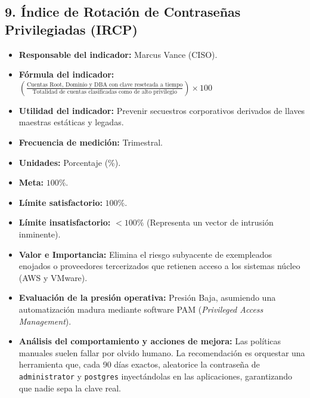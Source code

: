 \documentclass[11pt,a4paper]{article}
\begin{document}
\subsection{9. Índice de Rotación de Contraseñas Privilegiadas (IRCP)}
\begin{itemize}[label={--}, itemsep=0.1cm]
    \item \textbf{Responsable del indicador:} Marcus Vance (CISO).
    \item \textbf{Fórmula del indicador:} $\left(\frac{\text{Cuentas Root, Dominio y DBA con clave reseteada a tiempo}}{\text{Totalidad de cuentas clasificadas como de alto privilegio}}\right) \times 100$
    \item \textbf{Utilidad del indicador:} Prevenir secuestros corporativos derivados de llaves maestras estáticas y legadas.
    \item \textbf{Frecuencia de medición:} Trimestral.
    \item \textbf{Unidades:} Porcentaje (\%).
    \item \textbf{Meta:} $100\%$.
    \item \textbf{Límite satisfactorio:} $100\%$.
    \item \textbf{Límite insatisfactorio:} $< 100\%$ (Representa un vector de intrusión inminente).
    \item \textbf{Valor e Importancia:} Elimina el riesgo subyacente de exempleados enojados o proveedores tercerizados que retienen acceso a los sistemas núcleo (AWS y VMware).
    \item \textbf{Evaluación de la presión operativa:} Presión Baja, asumiendo una automatización madura mediante software PAM (\textit{Privileged Access Management}).
    \item \textbf{Análisis del comportamiento y acciones de mejora:} Las políticas manuales suelen fallar por olvido humano. La recomendación es orquestar una herramienta que, cada 90 días exactos, aleatorice la contraseña de \texttt{administrator} y \texttt{postgres} inyectándolas en las aplicaciones, garantizando que nadie sepa la clave real.
\end{itemize}
\end{document}
